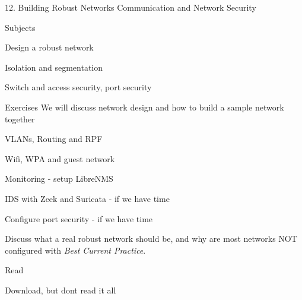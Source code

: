\documentclass[Screen16to9,17pt]{foils}
\begin{document}
\mytitlepage
{12. Building Robust Networks}
{Communication and Network Security \the\year}



\begin{list1}
\item Subjects
\begin{list2}
\item Design a robust network
\item Isolation and segmentation
\item Switch and access security, port security
\end{list2}
\item Exercises We will discuss network design and how to build a sample network together
\begin{list2}
\item VLANs, Routing and RPF
\item Wifi, WPA and guest network
\item Monitoring - setup LibreNMS
\item IDS with Zeek and Suricata - if we have time
\item Configure port security - if we have time
\end{list2}
\end{list1}

Discuss what a real robust network should be, and why are most networks NOT configured with \emph{Best Current Practice}.


\begin{list2}
\item Read
\item {\small {}}
\item {\small {}}
\item Download, but dont read it all\\{\small {}}
\end{list2}
\end{document}
